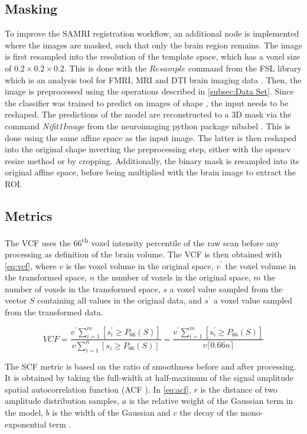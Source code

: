 \subsection{Masking}
To improve the SAMRI registration workflow, an additional node is implemented where the images are masked, such that only the brain region remains.
The image is first resampled into the resolution of the template space, which has a voxel size of $0.2\times 0.2 \times 0.2$.
This is done with the \textcolor{mg}{\texttt{$Resample$}} command from the FSL library which is an analysis tool for FMRI, MRI and DTI brain imaging data \cite{fsl}.
Then, the image is preprocessed using the operations described in \cref{subsec:Data Set}.
Since the classifier was trained to predict on images of shape
, the input needs to be reshaped.
The predictions of the model are reconstructed to a 3D mask via the command \textit{Nifit1Image} from the neuroimaging python package nibabel \cite{noauthor_neuroimaging_nodate}.
This is done using the same affine space as the input image.
The latter is then reshaped into the original shape inverting the preprocessing step, either with the opencv resize method or by cropping.
Additionally, the binary mask is resampled into its original affine space, before being multiplied with the brain image to extract the ROI.

\subsection{Metrics}

The VCF uses the 66\textsuperscript{th} voxel intensity percentile of the raw scan before any processing as definition of the brain volume.
The VCF is then obtained with \cref{eq:vcf}, where $v$ is the voxel volume in the original space, $v^\prime$ the voxel volume in the transformed space, $n$ the number of voxels in the original space, $m$ the number of voxels in the transformed space, $s$ a voxel value sampled from the vector $S$ containing all values in the original data, and $s^\prime$ a voxel value sampled from the transformed data.

\begin{equation} \label{eq:vcf}
        V\!C\!F
        = \frac{v^\prime\sum_{i=1}^m [s^\prime_i \geq P_{66}(S)]}{v\sum_{i=1}^n [s_i \geq P_{66}(S)]}
        = \frac{v^\prime\sum_{i=1}^m [s^\prime_i \geq P_{66}(S)]}{v \lceil0.66n\rceil}
\end{equation}

The SCF metric is based on the ratio of smoothness before and after processing.
It is obtained by taking the full-width at half-maximum of the signal amplitude spatial autocorrelation function (ACF \cite{eklund2016cluster}).
In \cref{eq:acf}, $r$ is the distance of two amplitude distribution samples, $a$ is the relative weight of the Gaussian term in the model, $b$ is the width of the Gaussian and $c$ the decay of the mono-exponential term \cite{cox2017fmri}.

